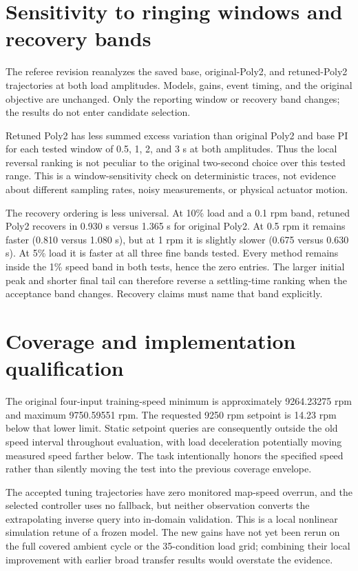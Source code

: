 \documentclass[11pt,a4paper,oneside]{report}
\begin{document}
\section{Sensitivity to ringing windows and recovery bands}
\label{sec:sensitivity}
The referee revision reanalyzes the saved base, original-Poly2, and retuned-Poly2 trajectories at both load amplitudes. Models, gains, event timing, and the original objective are unchanged. Only the reporting window or recovery band changes; the results do not enter candidate selection.

Retuned Poly2 has less summed excess variation than original Poly2 and base PI for each tested window of 0.5, 1, 2, and 3 s at both amplitudes. Thus the local reversal ranking is not peculiar to the original two-second choice over this tested range. This is a window-sensitivity check on deterministic traces, not evidence about different sampling rates, noisy measurements, or physical actuator motion.

The recovery ordering is less universal. At 10\% load and a 0.1 rpm band, retuned Poly2 recovers in 0.930 s versus 1.365 s for original Poly2. At 0.5 rpm it remains faster (0.810 versus 1.080 s), but at 1 rpm it is slightly slower (0.675 versus 0.630 s). At 5\% load it is faster at all three fine bands tested. Every method remains inside the 1\% speed band in both tests, hence the zero entries. The larger initial peak and shorter final tail can therefore reverse a settling-time ranking when the acceptance band changes. Recovery claims must name that band explicitly.

\section{Coverage and implementation qualification}
The original four-input training-speed minimum is approximately 9264.23275 rpm and maximum 9750.59551 rpm. The requested 9250 rpm setpoint is 14.23 rpm below that lower limit. Static setpoint queries are consequently outside the old speed interval throughout evaluation, with load deceleration potentially moving measured speed farther below. The task intentionally honors the specified speed rather than silently moving the test into the previous coverage envelope.

The accepted tuning trajectories have zero monitored map-speed overrun, and the selected controller uses no fallback, but neither observation converts the extrapolating inverse query into in-domain validation. This is a local nonlinear simulation retune of a frozen model. The new gains have not yet been rerun on the full covered ambient cycle or the 35-condition load grid; combining their local improvement with earlier broad transfer results would overstate the evidence.
\end{document}
